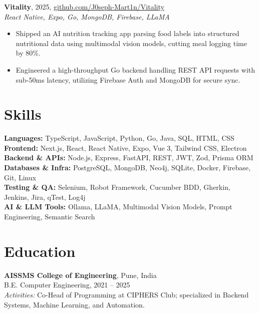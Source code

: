 \documentclass[letterpaper,10pt]{article}
\begin{document}
\vspace{3pt}
\textbf{Vitality}, 2025, \href{https://github.com/J0seph-Mart1n/Vitality}{github.com/J0seph-Mart1n/Vitality} \\
\textit{React Native, Expo, Go, MongoDB, Firebase, LLaMA}
\begin{itemize}
    \item Shipped an AI nutrition tracking app parsing food labels into structured nutritional data using multimodal vision models, cutting meal logging time by 80\%.
    \item Engineered a high-throughput Go backend handling REST API requests with sub-50ms latency, utilizing Firebase Auth and MongoDB for secure sync.
\end{itemize}

\section{Skills}

\vspace{2pt}
\noindent
\textbf{Languages:} TypeScript, JavaScript, Python, Go, Java, SQL, HTML, CSS \\
\textbf{Frontend:} Next.js, React, React Native, Expo, Vue 3, Tailwind CSS, Electron \\
\textbf{Backend \& APIs:} Node.js, Express, FastAPI, REST, JWT, Zod, Prisma ORM \\
\textbf{Databases \& Infra:} PostgreSQL, MongoDB, Neo4j, SQLite, Docker, Firebase, Git, Linux \\
\textbf{Testing \& QA:} Selenium, Robot Framework, Cucumber BDD, Gherkin, Jenkins, Jira, qTest, Log4j \\
\textbf{AI \& LLM Tools:} Ollama, LLaMA, Multimodal Vision Models, Prompt Engineering, Semantic Search

\section{Education}

\vspace{2pt}
\textbf{AISSMS College of Engineering}, Pune, India \\
B.E. Computer Engineering, 2021 -- 2025 \\
\textit{Activities:} Co-Head of Programming at CIPHERS Club; specialized in Backend Systems, Machine Learning, and Automation.
\end{document}
